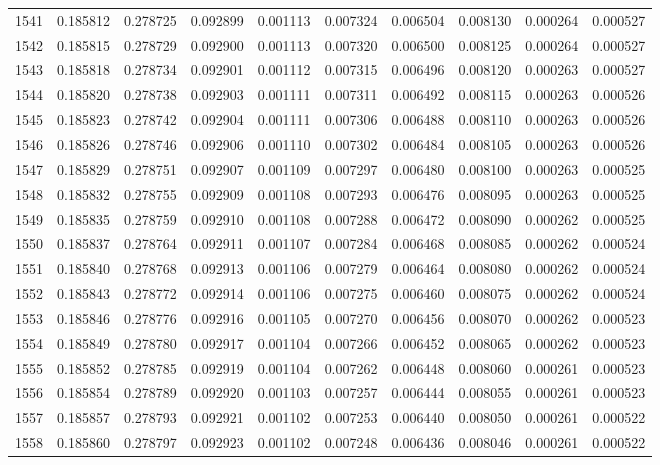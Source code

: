 \begin{tabular}{lrrrrrrrrr}
1541 & 0.185812 & 0.278725 & 0.092899 & 0.001113 & 0.007324 & 0.006504 & 0.008130 & 0.000264 & 0.000527 \\
1542 & 0.185815 & 0.278729 & 0.092900 & 0.001113 & 0.007320 & 0.006500 & 0.008125 & 0.000264 & 0.000527 \\
1543 & 0.185818 & 0.278734 & 0.092901 & 0.001112 & 0.007315 & 0.006496 & 0.008120 & 0.000263 & 0.000527 \\
1544 & 0.185820 & 0.278738 & 0.092903 & 0.001111 & 0.007311 & 0.006492 & 0.008115 & 0.000263 & 0.000526 \\
1545 & 0.185823 & 0.278742 & 0.092904 & 0.001111 & 0.007306 & 0.006488 & 0.008110 & 0.000263 & 0.000526 \\
1546 & 0.185826 & 0.278746 & 0.092906 & 0.001110 & 0.007302 & 0.006484 & 0.008105 & 0.000263 & 0.000526 \\
1547 & 0.185829 & 0.278751 & 0.092907 & 0.001109 & 0.007297 & 0.006480 & 0.008100 & 0.000263 & 0.000525 \\
1548 & 0.185832 & 0.278755 & 0.092909 & 0.001108 & 0.007293 & 0.006476 & 0.008095 & 0.000263 & 0.000525 \\
1549 & 0.185835 & 0.278759 & 0.092910 & 0.001108 & 0.007288 & 0.006472 & 0.008090 & 0.000262 & 0.000525 \\
1550 & 0.185837 & 0.278764 & 0.092911 & 0.001107 & 0.007284 & 0.006468 & 0.008085 & 0.000262 & 0.000524 \\
1551 & 0.185840 & 0.278768 & 0.092913 & 0.001106 & 0.007279 & 0.006464 & 0.008080 & 0.000262 & 0.000524 \\
1552 & 0.185843 & 0.278772 & 0.092914 & 0.001106 & 0.007275 & 0.006460 & 0.008075 & 0.000262 & 0.000524 \\
1553 & 0.185846 & 0.278776 & 0.092916 & 0.001105 & 0.007270 & 0.006456 & 0.008070 & 0.000262 & 0.000523 \\
1554 & 0.185849 & 0.278780 & 0.092917 & 0.001104 & 0.007266 & 0.006452 & 0.008065 & 0.000262 & 0.000523 \\
1555 & 0.185852 & 0.278785 & 0.092919 & 0.001104 & 0.007262 & 0.006448 & 0.008060 & 0.000261 & 0.000523 \\
1556 & 0.185854 & 0.278789 & 0.092920 & 0.001103 & 0.007257 & 0.006444 & 0.008055 & 0.000261 & 0.000523 \\
1557 & 0.185857 & 0.278793 & 0.092921 & 0.001102 & 0.007253 & 0.006440 & 0.008050 & 0.000261 & 0.000522 \\
1558 & 0.185860 & 0.278797 & 0.092923 & 0.001102 & 0.007248 & 0.006436 & 0.008046 & 0.000261 & 0.000522 \\

\end{tabular}
